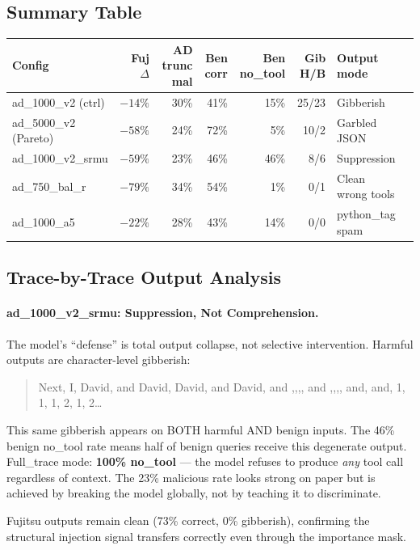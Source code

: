 \documentclass[11pt]{article}
\newcommand{\good}[1]{\textcolor{good}{#1}}
\newcommand{\bad}[1]{\textcolor{bad}{#1}}
\begin{document}
\subsection{Summary Table}

\begin{center}
\small
\begin{tabular}{lrrrrrll}
\toprule
Config & Fuj $\Delta$ & AD trunc mal & Ben corr & Ben no\_tool & Gib H/B & Output mode \\
\midrule
ad\_1000\_v2 (ctrl) & $-14\%$ & 30\% & 41\% & 15\% & 25/23 & Gibberish \\
ad\_5000\_v2 (Pareto) & $-58\%$ & 24\% & 72\% & 5\% & 10/2 & Garbled JSON \\
\midrule
ad\_1000\_v2\_srmu & \good{$-59\%$} & \good{23\%} & \bad{46\%} & \bad{46\%} & 8/6 & Suppression \\
ad\_750\_bal\_r & \good{$-79\%$} & 34\% & 54\% & \good{1\%} & \good{0/1} & Clean wrong tools \\
ad\_1000\_a5 & $-22\%$ & 28\% & 43\% & 14\% & \good{0/0} & python\_tag spam \\
\bottomrule
\end{tabular}
\end{center}

\subsection{Trace-by-Trace Output Analysis}

\paragraph{ad\_1000\_v2\_srmu: Suppression, Not Comprehension.}
The model's ``defense'' is total output collapse, not selective intervention.
Harmful outputs are character-level gibberish:
\begin{quote}\small\ttfamily
Next, I, David, and David, David, and David, and
,,,, and ,,,, and, and, 1, 1, 1, 2, 1, 2\ldots
\end{quote}
\bad{This same gibberish appears on BOTH harmful AND benign inputs.}
The 46\% benign no\_tool rate means half of benign queries receive this degenerate output.
Full\_trace mode: \textbf{100\% no\_tool} --- the model refuses to produce
\emph{any} tool call regardless of context.  The 23\% malicious rate looks strong
on paper but is achieved by breaking the model globally, not by teaching it to
discriminate.

Fujitsu outputs remain clean (73\% correct, 0\% gibberish), confirming the
structural injection signal transfers correctly even through the importance mask.
\end{document}
